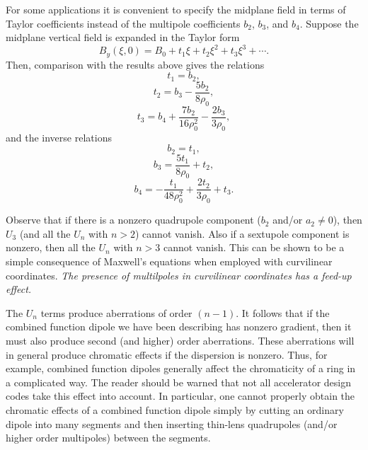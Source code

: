 For some applications it is convenient to specify the midplane field in terms of Taylor coefficients instead of the multipole coefficients $b_2$, $b_3$, and $b_4$.  Suppose the midplane vertical field is expanded in the Taylor form
     \begin{equation}
     B_y(\xi,0) = B_0 +t_1 \xi + t_2 \xi^2 + t_3 \xi^3 + \cdots.
     \end {equation}
Then, comparison with the results above gives the relations
\begin{equation}
t_1 = b_2,
\end{equation}
\begin{equation}
t_2 = b_3 - \frac{5b_2}{8\rho_0},
\end{equation}
\begin{equation}
t_3 = b_4 + \frac{7b_2}{16\rho_0^2} - \frac{2b_3}{3\rho_0},
\end{equation}
and the inverse relations
\begin{equation}
b_2 = t_1,
\end{equation}
\begin{equation}
b_3 =\frac{5t_1}{8\rho_0} + t_2,
\end{equation}
\begin{equation}
b_4 = -\frac{t_1}{48\rho_0^2} + \frac{2t_2}{3\rho_0} + t_3.
\end{equation}

Observe that if there is a nonzero quadrupole component ($b_2$ and/or $a_2 \neq 0$), then $U_3$ (and all the $U_n$ with $n >2$) cannot vanish.  Also if a sextupole component is nonzero, then all the $U_n$ with $n > 3$ cannot vanish.  This can be shown to be a simple consequence of Maxwell's equations when employed with curvilinear coordinates.  {\em The presence of multilpoles in curvilinear coordinates has a feed-up effect.}

The $U_n$ terms produce aberrations of order $(n-1)$.  It follows that if the combined function dipole we have been describing has nonzero gradient, then it must also produce second (and higher) order aberrations.  These aberrations will in general produce chromatic effects if the dispersion is nonzero.  Thus, for example, combined function dipoles generally affect the chromaticity of a ring in a complicated way.  The reader should be warned that not all accelerator design codes take this effect into account.  In particular, one cannot properly obtain the chromatic effects of a combined function dipole simply  by cutting an ordinary dipole into many segments and then inserting thin-lens quadrupoles (and/or higher order multipoles) between the segments.

